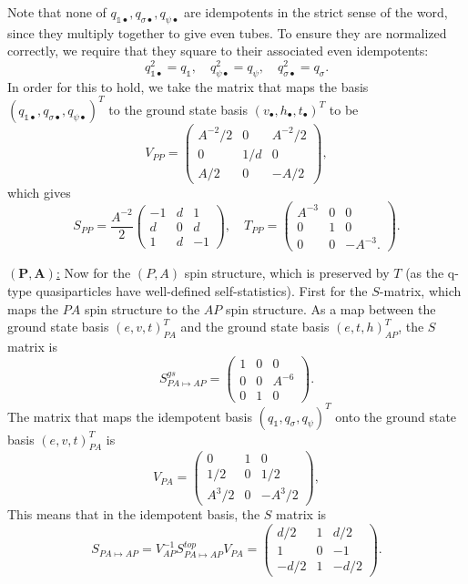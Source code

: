 \documentclass[12pt,a4paper]{article}
\newcommand{\unit}{\mathds{1}}
\newcommand\be            {\begin{equation}}
\newcommand\ee            {\end{equation}}
\begin{document}
Note that none of $q_{\unit\bullet},q_{\sigma\bullet},q_{\psi\bullet}$ are idempotents in the strict sense of the word, since they multiply together to give even tubes. To ensure they are normalized correctly, we require that they square to their associated even idempotents:
\be q_{\unit\bullet}^2 = q_\unit,\quad q_{\psi\bullet}^2 = q_\psi,\quad q_{\sigma\bullet}^2 = q_\sigma.\ee
In order for this to hold, we %
take the matrix that maps the basis $(q_{\unit\bullet},q_{\sigma\bullet},q_{\psi\bullet})^T$ to the ground state basis $(v_\bullet,h_\bullet,t_\bullet)^T$ to be 
\be V_{PP} = \begin{pmatrix} A^{-2}/2 & 0 & A^{-2}/2 \\ 0 & 1/d & 0 \\ A/2 & 0 & -A/2 \end{pmatrix},\ee
which gives 
\be S_{PP} = \frac{A^{-2}}{2} \begin{pmatrix} -1 & d & 1 \\ d & 0 & d \\ 1 & d & -1 \end{pmatrix},\quad T_{PP} = \begin{pmatrix} A^{-3} & 0 & 0 \\ 0 & 1 & 0 \\ 0& 0& -A^{-3}.\end{pmatrix}.\ee




\underline{$\mathbf{(P,A)}$:} Now for the $(P,A)$ spin structure, which is preserved by $T$ (as the q-type quasiparticles have well-defined self-statistics). First for the $S$-matrix, which maps the $PA$ spin structure to the $AP$ spin structure. As a map between the ground state basis $(e,v,t)_{PA}^T$ and the ground state basis $(e,t,h)_{AP}^T$, the $S$ matrix is
\be S^{gs}_{PA\mapsto AP} = \begin{pmatrix}
1 & 0& 0 \\ 0 & 0 & A^{-6} \\ 0&1& 0
\end{pmatrix}.\ee
The matrix that maps the idempotent basis $(q_\unit,q_\sigma,q_\psi)^T$ onto the ground state basis $(e,v,t)_{PA}^T$ is 
\be V_{PA} = \begin{pmatrix}
0 & 1 & 0 \\ 1/2 & 0 & 1/2 \\ A^3/2 & 0 & -A^3/2
\end{pmatrix},\ee
This means that in the idempotent basis, the $S$ matrix is 
\be S_{PA \mapsto AP} = V_{AP}^{-1} S^{top}_{PA \mapsto AP} V_{PA} = \begin{pmatrix}
d/2 & 1 & d/2 \\ 1 & 0 & -1 \\ -d/2 & 1 & -d/2
\end{pmatrix}.\ee
\end{document}
